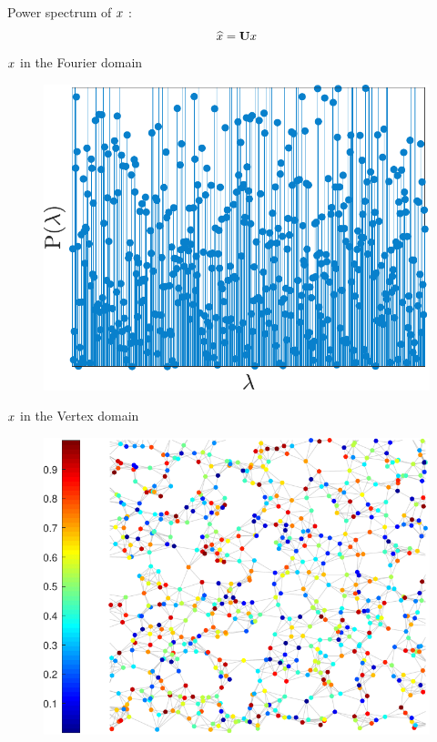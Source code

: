 \documentclass[11pts]{beamer}
\begin{document}
\begin{frame}
\begin{minipage}{0.5\textwidth}
    \end{minipage}
    \hfill
    \begin{minipage}{0.45\textwidth}
    \centering
    Power spectrum of  $\mathnormal{x}$ :
\begin{equation*}
   \widehat{\mathnormal{x}}  =\mathbf{U}\mathnormal{x}
\end{equation*}
 \vspace*{-0.4cm}
$\mathnormal{x}$ in the Fourier domain
 \vspace*{0.2cm}
 \begin{figure}
     \centering
     \includegraphics[scale=0.23]{IM/Sig.pdf}
 \end{figure}
 \vspace*{-0.3cm}
 $\mathnormal{x}$ in the Vertex domain
  \begin{figure}
     \centering
    \hspace*{0.25cm} \includegraphics[scale=0.3]{IM/Sig_R.pdf}
 \end{figure}
    \end{minipage}

 
 
\end{frame}
\end{document}
